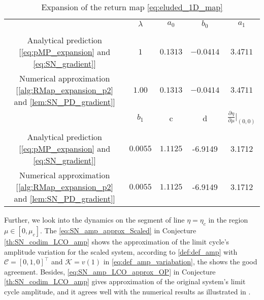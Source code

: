 \begin{table}[ht!]
	\caption{Expansion of the return map \cref{eq:eluded_1D_map}} %
	\label{tab:RMap_expansion}
	\centering %
	\begin{tabular}{c c c c c }
		\hline\hline
		& $\lambda$ & $a_0$    & $b_0$     & $a_1$                                         \\
		\vspace{-1em}
		\\
		\hline
		Analytical prediction [\eqref{eq:pMP_expansion} and \eqref{eq:SN_gradient}] & $1$    & $0.1313$ & $-0
		.0414$ &
		$3.4711$                                      \\
		Numerical approximation [\cref{alg:RMap_expansion_p2} and \cref{lem:SN_PD_gradient}]
		& $1.00$     & $0.1313$        & $-0.0414$         & $3.4711$ \\
		\hline
		& $b_1$ & c & d & $\frac{\partial \eta}{\partial \mu}|_{(0,0)}$\\
		\vspace{-1em}
		\\
		\hline
		Analytical prediction [\eqref{eq:pMP_expansion} and \eqref{eq:SN_gradient}] &
		$0.0055$ & $1.1125$ & -6.9149 & 3.1712 \\
		Numerical approximation [\cref{alg:RMap_expansion_p2} and \cref{lem:SN_PD_gradient}] &
		$0.0055$ & $1.1125$ & -6.9149 & 3.1712 \\
		\hline
	\end{tabular}
\end{table}
%
Further, we look into the dynamics on the segment of line $\eta = \eta_c$ in the region $\mu \in [0,\mu_c]$. The
\cref{eq:SN_amp_approx_Scaled} in Conjecture \ref{th:SN_codim_LCO_amp} shows the approximation of the limit
cycle's amplitude variation for the scaled system, according to \cref{def:def_amp} with $\mathcal{C} = [0,1,
0]^{\top}$ and $\mathcal{K} = v(1)$ in \cref{eq:def_amp_variabation}, the  shows the
good agreement.
Besides, \cref{eq:SN_amp_LCO_approx_OP} in Conjecture \ref{th:SN_codim_LCO_amp} gives approximation of the
original system's limit cycle amplitude, and it agrees well with the numerical results as illustrated in
.
%


